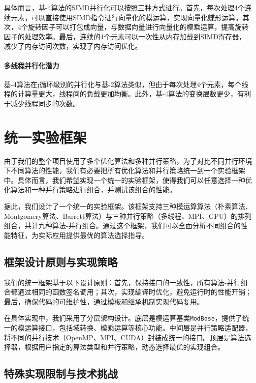 \documentclass[a4paper]{article}
\begin{document}
具体而言，基-4算法的SIMD并行化可以按照三种方式进行。首先，每次处理4个连续元素，可以直接使用SIMD指令进行向量化的模运算，实现向量化蝶形运算。其次，4个旋转因子可以打包成向量，与数据向量进行向量化的模乘运算，提高旋转因子的处理效率。最后，连续的4个元素可以一次性从内存加载到SIMD寄存器，减少了内存访问次数，实现了内存访问优化。

\paragraph{多线程并行化潜力} 基-4算法在j循环级别的并行化与基-2算法类似，但由于每次处理4个元素，每个线程的计算量更大，线程间的负载更加均衡。此外，基-4算法的变换层数更少，有利于减少线程同步的次数。

\section{统一实验框架}

由于我们的整个项目使用了多个优化算法和多种并行策略，为了对比不同并行环境下不同算法的性能，我们有必要把所有优化算法和并行策略统一到一个实验框架中。具体而言，我们希望实现一个统一的实验框架，使得我们可以任意选择一种优化算法和一种并行策略进行组合，并测试该组合的性能。

据此，我们设计了一个统一的实验框架。该框架支持三种模运算算法（朴素算法、Montgomery算法、Barrett算法）与三种并行策略（多线程、MPI、GPU）的排列组合，共计九种算法-并行组合。通过这个框架，我们可以全面分析不同组合的性能特征，为实际应用提供最优的算法选择指导。

\subsection{框架设计原则与实现策略}

我们的统一框架基于以下设计原则：首先，保持接口的一致性，所有算法-并行组合都通过相同的函数签名调用；其次，实现编译时优化，避免运行时的性能开销；最后，确保代码的可维护性，通过模板和继承机制实现代码复用。

在具体实现中，我们采用了分层架构设计。底层是模运算基类\texttt{ModBase}，提供了统一的模运算接口，包括域转换、模乘运算等核心功能。中间层是并行策略适配器，将不同的并行技术（OpenMP、MPI、CUDA）封装成统一的接口。顶层是算法选择器，根据用户指定的算法类型和并行策略，动态选择最优的实现组合。

\subsection{特殊实现限制与技术挑战}
\end{document}
